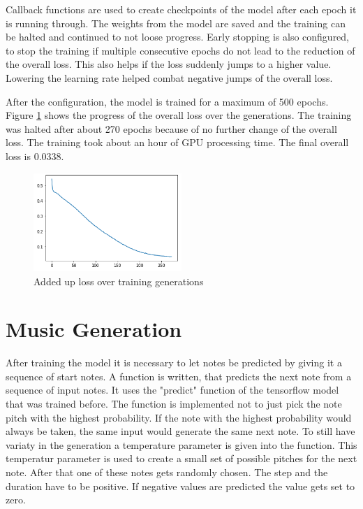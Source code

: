 Callback functions are used to create checkpoints of the model after each epoch it is running through. The weights from the model
are saved and the training can be halted and continued to not loose progress. Early stopping is also configured, to stop the 
training if multiple consecutive epochs do not lead to the reduction of the overall loss. This also helps if the loss suddenly
jumps to a higher value. Lowering the learning rate helped combat negative jumps of the overall loss.

After the configuration, the model is trained for a maximum of 500 epochs. Figure \ref{fig:loss} shows the progress of the 
overall loss over the generations. The training was halted after about 270 epochs because of no further change of the overall loss.
The training took about an hour of GPU processing time. The final overall loss is 0.0338.


\begin{figure}
\centering
\includegraphics[width=0.5\textwidth]{./pics/Loss.PNG}
\caption{Added up loss over training generations}
\label{fig:loss}    
\end{figure}

\section{Music Generation}
\label{gen}

After training the model it is necessary to let notes be predicted by giving it a sequence of start notes. A function is 
written, that predicts the next note from a sequence of input notes. It uses the "predict" function of the tensorflow
model that was trained before. The function is implemented not to just pick the note pitch with the highest probability.
If the note with the highest probability would always be taken, the same input would generate the same next note. 
To still have variaty in the generation a temperature parameter is given into the function. This temperatur parameter is used
to create a small set of possible pitches for the next note. After that one of these notes gets randomly chosen.
The step and the duration have to be positive. If negative values are predicted the value gets set to zero.


